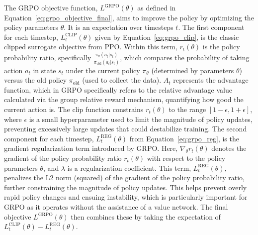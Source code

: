 The GRPO objective function, $L^{\text{GRPO}}(\theta)$ as defined in Equation~\eqref{eq:grpo_objective_final}, aims to improve the policy by optimizing the policy parameters $\theta$. It is an expectation over timesteps $t$.
The first component for each timestep, $L^{\text{CLIP}}_t(\theta)$ given by Equation~\eqref{eq:grpo_clip}, is the classic clipped surrogate objective from PPO. Within this term, $r_t(\theta)$ is the policy probability ratio, specifically $\frac{\pi_\theta(a_t|s_t)}{\pi_{\text{old}}(a_t|s_t)}$, which compares the probability of taking action $a_t$ in state $s_t$ under the current policy $\pi_\theta$ (determined by parameters $\theta$) versus the old policy $\pi_{\text{old}}$ (used to collect the data). $A_t$ represents the advantage function, which in GRPO specifically refers to the relative advantage value calculated via the group relative reward mechanism, quantifying how good the current action is. The $\text{clip}$ function constrains $r_t(\theta)$ to the range $[1-\epsilon, 1+\epsilon]$, where $\epsilon$ is a small hyperparameter used to limit the magnitude of policy updates, preventing excessively large updates that could destabilize training.
The second component for each timestep, $L^{\text{REG}}_t(\theta)$ from Equation~\eqref{eq:grpo_reg}, is the gradient regularization term introduced by GRPO. Here, $\nabla_\theta r_t(\theta)$ denotes the gradient of the policy probability ratio $r_t(\theta)$ with respect to the policy parameters $\theta$, and $\lambda$ is a regularization coefficient. This term, $L^{\text{REG}}_t(\theta)$, penalizes the L2 norm (squared) of the gradient of the policy probability ratio, further constraining the magnitude of policy updates. This helps prevent overly rapid policy changes and ensuing instability, which is particularly important for GRPO as it operates without the assistance of a value network. The final objective $L^{\text{GRPO}}(\theta)$ then combines these by taking the expectation of $L^{\text{CLIP}}_t(\theta) - L^{\text{REG}}_t(\theta)$.






